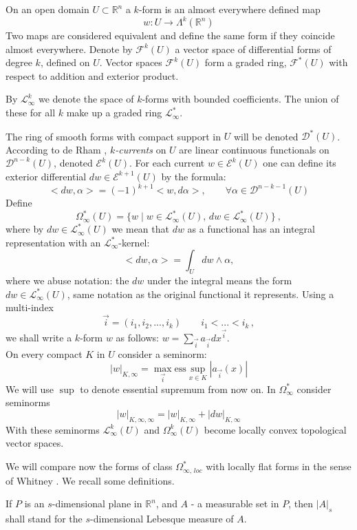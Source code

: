 \documentclass{amsart}%
\newcommand{\Rn}{\mathbb{R}^{n}}
\begin{document}
On an open domain $U\subset\mathbb{R}^{n}$ a $k$-form is an almost
everywhere defined map
$$w:U\rightarrow\Lambda^{k}(\mathbb{R}^{n})$$
Two maps are considered equivalent and define the same form if
they coincide almost everywhere. Denote by $\mathcal{F}^{k}(U)$ a
vector space of differential forms of degree $k$, defined on $U$.
Vector spaces $\mathcal{F}^{k}(U)$ form a graded ring,
$\mathcal{F}^{*}(U)$ with respect to addition and exterior
product.

By $\mathcal{L}^{k}_{\infty}$ we denote the space of $k$-forms
with bounded coefficients. The union of these for all $k$ make up
a graded ring $\mathcal{L}^{*}_{\infty}$.

The ring of smooth forms with compact support in $U$ will be
denoted $\mathcal{D}^{*}(U)$. According to de Rham \cite{dR},
\emph{$k$-currents} on $U$  are linear continuous functionals on
$\mathcal{D}^{n-k}(U)$, denoted $\mathcal{E}^{k}(U)$. For each
current $w\in\mathcal{E}^{k}(U)$ one can define its exterior
differential $dw\in\mathcal{E}^{k+1}(U)$ by the formula:
$$<dw,\alpha>=(-1)^{k+1}<w,d\alpha>,\quad\quad \forall\alpha\in\mathcal{D}^{n-k-1}(U)
$$
Define
$$\Omega^{*}_{\infty}(U)=\{w\mid w\in\mathcal{L}^{*}_{\infty}(U),\,dw\in\mathcal{L}^{*}_{\infty}(U)\}\ ,$$
where by $dw\in\mathcal{L}^{*}_{\infty}(U)$ we mean that $dw$ as a
functional has an integral representation with an
$\mathcal{L}^{*}_{\infty}$-kernel:
$$<dw,\alpha>=\int_{U}dw\wedge\alpha,
$$
where we abuse notation: the $dw$ under the integral means the
form $dw\in\mathcal{L}^{*}_{\infty}(U)$, same notation as the
original functional it represents. Using a multi-index
$$\vec{i}=(i_{1},i_{2},...,i_{k})\quad\quad i_1<...<i_{k}\,,$$ we shall write
a $k$-form $w$ as follows:
$w=\displaystyle{\sum_{\vec{i}}a_{\vec{i}}dx^{\vec{i}}}$.\\On
every compact $K$ in $U$ consider a seminorm:
$$|w|_{K,\infty}=\max_{\vec{i}} \textrm{ess}\sup_{x \in K}|a_{\vec{i}}(x)|
$$
We will use $\sup$ to denote essential supremum from now on. In
$\Omega^{*}_{\infty}$ consider\\seminorms
$$|w|_{K,\infty,\infty}=|w|_{K,\infty}+|dw|_{K,\infty}
$$
With these seminorms $\mathcal{L}^{k}_{\infty}(U)$ and
$\Omega^{k}_{\infty}(U)$ become locally convex
topological vector spaces. %

We will compare now the forms of class $\Omega^{*}_{\infty,\,loc}$
with locally flat forms in the sense of Whitney \cite[IX.6]{W}. We
recall some definitions.

If $P$ is an $s$-dimensional plane in $\Rn$, and $A$ - a
measurable set in $P$, then $|A|_s$ shall stand for the
$s$-dimensional Lebesque measure of $A$.
\end{document}
